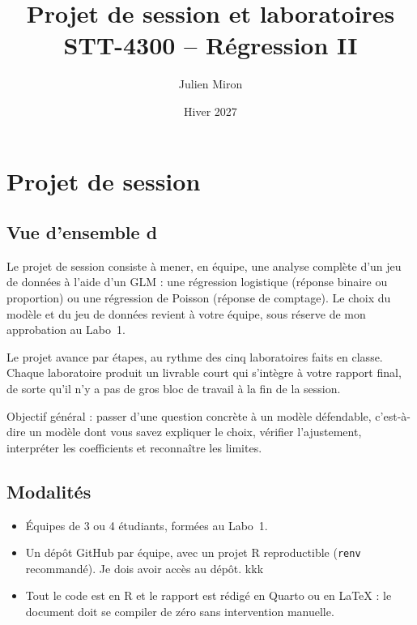 \documentclass[11pt,letterpaper]{scrartcl}
\title{Projet de session et laboratoires\\\large STT-4300 -- Régression II}
\author{Julien Miron}
\date{Hiver 2027}
\begin{document}
\maketitle
\tableofcontents
\bigskip

\section{Projet de session}

\subsection{Vue d'ensemble d}

Le projet de session consiste à mener, en équipe, une analyse complète d'un jeu de données à l'aide d'un GLM : une régression logistique (réponse binaire ou proportion) ou une régression de Poisson (réponse de comptage). Le choix du modèle et du jeu de données revient à votre équipe, sous réserve de mon approbation au Labo~1.

Le projet avance par étapes, au rythme des cinq laboratoires faits en classe. Chaque laboratoire produit un livrable court qui s'intègre à votre rapport final, de sorte qu'il n'y a pas de gros bloc de travail à la fin de la session.

\begin{envremarque}
Objectif général : passer d'une question concrète à un modèle défendable, c'est-à-dire un modèle dont vous savez expliquer le choix, vérifier l'ajustement, interpréter les coefficients et reconnaître les limites.
\end{envremarque}

\subsection{Modalités}

\begin{itemize}
  \item Équipes de 3 ou 4 étudiants, formées au Labo~1.
  \item Un dépôt GitHub par équipe, avec un projet R reproductible (\texttt{renv} recommandé). Je dois avoir accès au dépôt. kkk
  \item Tout le code est en R et le rapport est rédigé en Quarto ou en \LaTeX{} : le document doit se compiler de zéro sans intervention manuelle.
\end{itemize}
\end{document}
